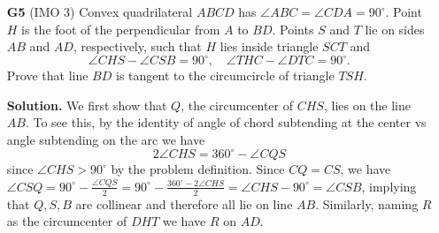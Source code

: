 \documentclass[11pt,a4paper]{article}
\begin{document}
\begin{enumerate}
	\item [\textbf{G5}] (IMO 3) Convex quadrilateral $ABCD$ has $\angle ABC = \angle CDA = 90^{\circ}$. Point $H$ is the foot of the perpendicular from $A$ to $BD$. Points $S$ and $T$ lie on sides $AB$ and $AD$, respectively, such that $H$ lies inside triangle $SCT$ and \[
	\angle CHS - \angle CSB = 90^{\circ}, \quad \angle THC - \angle DTC = 90^{\circ}. \] Prove that line $BD$ is tangent to the circumcircle of triangle $TSH$.
	
	\textbf{Solution.} We first show that $Q$, the circumcenter of $CHS$, lies on the line $AB$. To see this, by the identity of angle of chord subtending at the center vs angle subtending on the arc we have 
	\[2\angle CHS = 360^{\circ} - \angle CQS
	\]
	since $\angle CHS>90^{\circ}$ by the problem definition. 
	Since $CQ=CS$, we have $\angle CSQ = 90^{\circ} - \frac{\angle CQS}{2} = 90^{\circ} - \frac{360^{\circ} - 2\angle CHS}{2} = \angle CHS - 90^{\circ} = \angle CSB$, implying that $Q, S, B$ are collinear and therefore all lie on line $AB$. Similarly, naming $R$ as the circumcenter of $DHT$ we have $R$ on $AD$. 
	

\end{enumerate}
\end{document}
